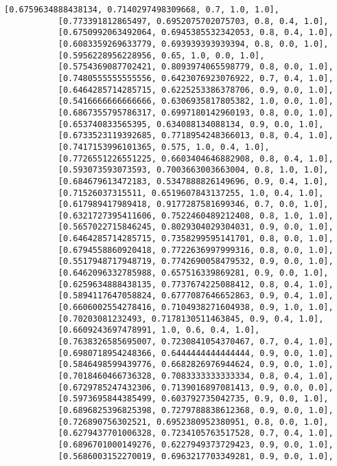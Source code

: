 \documentclass[11pt]{article}
\begin{document}
\begin{Verbatim}[commandchars=\\\{\}]
           [0.6759634888438134, 0.7140297498309668, 0.7, 1.0, 1.0],
           [0.773391812865497, 0.6952075702075703, 0.8, 0.4, 1.0],
           [0.6750992063492064, 0.6945385532342053, 0.8, 0.4, 1.0],
           [0.6083359269633779, 0.693939393939394, 0.8, 0.0, 1.0],
           [0.5956228956228956, 0.65, 1.0, 0.0, 1.0],
           [0.5754369087702421, 0.8093974065598779, 0.8, 0.0, 1.0],
           [0.7480555555555556, 0.6423076923076922, 0.7, 0.4, 1.0],
           [0.6464285714285715, 0.6225253386378706, 0.9, 0.0, 1.0],
           [0.5416666666666666, 0.6306935817805382, 1.0, 0.0, 1.0],
           [0.6867355795786317, 0.6997180142960193, 0.8, 0.0, 1.0],
           [0.653740833565395, 0.634088134088134, 0.9, 0.0, 1.0],
           [0.6733523119392685, 0.7718954248366013, 0.8, 0.4, 1.0],
           [0.7417153996101365, 0.575, 1.0, 0.4, 1.0],
           [0.7726551226551225, 0.6603404646882908, 0.8, 0.4, 1.0],
           [0.593073593073593, 0.7003663003663004, 0.8, 1.0, 1.0],
           [0.684679613472183, 0.5347888826149696, 0.9, 0.4, 1.0],
           [0.71526037315511, 0.6519607843137255, 1.0, 0.4, 1.0],
           [0.617989417989418, 0.9177287581699346, 0.7, 0.0, 1.0],
           [0.6321727395411606, 0.7522460489212408, 0.8, 1.0, 1.0],
           [0.5657022715846245, 0.8029304029304031, 0.9, 0.0, 1.0],
           [0.6464285714285715, 0.7358299595141701, 0.8, 0.0, 1.0],
           [0.6794558860920418, 0.7722636997999316, 0.8, 0.0, 1.0],
           [0.5517948717948719, 0.7742690058479532, 0.9, 0.0, 1.0],
           [0.6462096332785988, 0.657516339869281, 0.9, 0.0, 1.0],
           [0.6259634888438135, 0.7737674225088412, 0.8, 0.4, 1.0],
           [0.5894117647058824, 0.6777087646652863, 0.9, 0.4, 1.0],
           [0.6606002554278416, 0.7104938271604938, 0.9, 1.0, 1.0],
           [0.70203081232493, 0.7178130511463845, 0.9, 0.4, 1.0],
           [0.6609243697478991, 1.0, 0.6, 0.4, 1.0],
           [0.7638326585695007, 0.7230841054370467, 0.7, 0.4, 1.0],
           [0.6980718954248366, 0.6444444444444444, 0.9, 0.0, 1.0],
           [0.5846498599439776, 0.6682826976944624, 0.9, 0.0, 1.0],
           [0.7018460466736328, 0.7083333333333334, 0.8, 0.4, 1.0],
           [0.6729785247432306, 0.7139016897081413, 0.9, 0.0, 0.0],
           [0.5973695844385499, 0.603792735042735, 0.9, 0.0, 1.0],
           [0.6896825396825398, 0.7279788838612368, 0.9, 0.0, 1.0],
           [0.726890756302521, 0.6952380952380951, 0.8, 0.0, 1.0],
           [0.6279437701006328, 0.7234105763517528, 0.7, 0.4, 1.0],
           [0.6896701000149276, 0.6227949373729423, 0.9, 0.0, 1.0],
           [0.5686003152270019, 0.6963217703349281, 0.9, 0.0, 1.0],

\end{Verbatim}
\end{document}
